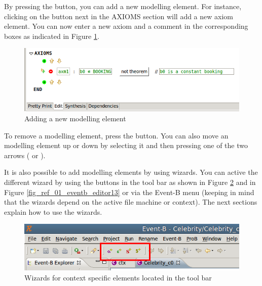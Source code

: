 By pressing the  button, you can add a new modelling element. For instance, clicking on the  button next in the \textsf{AXIOMS} section will add a new axiom element. You can now enter a new axiom and a comment in the corresponding boxes as indicated in Figure \ref{fig_ref_01_eventb_editor3}.

\begin{figure}[!ht]
\begin{center}
	\includegraphics{img/reference/ref_01_eventb_editor3.png}
	\caption{Adding a new modelling element}
	\label{fig_ref_01_eventb_editor3}
\end{center}
\end{figure}

To remove a modelling element, press the  button. You can also move an modelling element up or down by selecting it and then pressing one of the two arrows ( or ).

It is also possible to add modelling elements by using wizards. You can active the different wizard by using the buttons in the tool bar as shown in Figure \ref{fig_ref_01_eventb_editor12} and in Figure \ref{fig_ref_01_eventb_editor13} or via the Event-B menu (keeping in mind that the wizards depend on the active file machine or context). The next sections explain how to use the wizards.

\begin{figure}[!ht]
\begin{center}
	\includegraphics{img/reference/ref_01_eventb_editor12.png}
	\caption{Wizards for context specific elements located in the tool bar}
	\label{fig_ref_01_eventb_editor12}
\end{center}
\end{figure}

